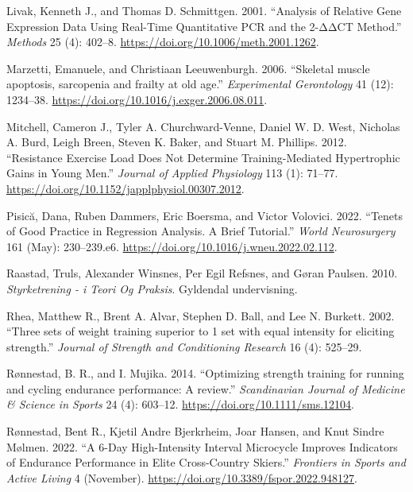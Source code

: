 \documentclass[
  letterpaper,
  DIV=11,
  numbers=noendperiod]{scrreprt}
\newlength{\cslhangindent}
\newenvironment{CSLReferences}[2] %
 {\begin{list}{}{%
  \setlength{\itemindent}{0pt}
  \setlength{\leftmargin}{0pt}
  \setlength{\parsep}{0pt}
  \ifodd #1
   \setlength{\leftmargin}{\cslhangindent}
   \setlength{\itemindent}{-1\cslhangindent}
  \fi
  \setlength{\itemsep}{#2\baselineskip}}}
 {\end{list}}
\begin{document}
\begin{CSLReferences}{1}{0}
Livak, Kenneth J., and Thomas D. Schmittgen. 2001. {``Analysis of
Relative Gene Expression Data Using Real-Time Quantitative PCR and the
2{-}ΔΔCT Method.''} \emph{Methods} 25 (4): 402--8.
\url{https://doi.org/10.1006/meth.2001.1262}.

Marzetti, Emanuele, and Christiaan Leeuwenburgh. 2006. {``Skeletal
muscle apoptosis, sarcopenia and frailty at old age.''}
\emph{Experimental Gerontology} 41 (12): 1234--38.
\url{https://doi.org/10.1016/j.exger.2006.08.011}.

Mitchell, Cameron J., Tyler A. Churchward-Venne, Daniel W. D. West,
Nicholas A. Burd, Leigh Breen, Steven K. Baker, and Stuart M. Phillips.
2012. {``Resistance Exercise Load Does Not Determine Training-Mediated
Hypertrophic Gains in Young Men.''} \emph{Journal of Applied Physiology}
113 (1): 71--77. \url{https://doi.org/10.1152/japplphysiol.00307.2012}.

Pisică, Dana, Ruben Dammers, Eric Boersma, and Victor Volovici. 2022.
{``Tenets of Good Practice in Regression Analysis. A Brief Tutorial.''}
\emph{World Neurosurgery} 161 (May): 230--239.e6.
\url{https://doi.org/10.1016/j.wneu.2022.02.112}.

Raastad, Truls, Alexander Winsnes, Per Egil Refsnes, and Gøran Paulsen.
2010. \emph{Styrketrening - i Teori Og Praksis}. Gyldendal undervisning.

Rhea, Matthew R., Brent A. Alvar, Stephen D. Ball, and Lee N. Burkett.
2002. {``Three sets of weight training superior to 1 set with equal
intensity for eliciting strength.''} \emph{Journal of Strength and
Conditioning Research} 16 (4): 525--29.

Rønnestad, B. R., and I. Mujika. 2014. {``Optimizing strength training
for running and cycling endurance performance: A review.''}
\emph{Scandinavian Journal of Medicine \& Science in Sports} 24 (4):
603--12. \url{https://doi.org/10.1111/sms.12104}.

Rønnestad, Bent R., Kjetil Andre Bjerkrheim, Joar Hansen, and Knut
Sindre Mølmen. 2022. {``A 6-Day High-Intensity Interval Microcycle
Improves Indicators of Endurance Performance in Elite Cross-Country
Skiers.''} \emph{Frontiers in Sports and Active Living} 4 (November).
\url{https://doi.org/10.3389/fspor.2022.948127}.


\end{CSLReferences}
\end{document}
